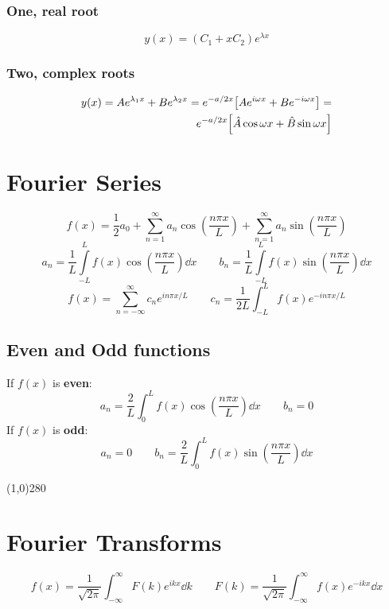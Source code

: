\documentclass[10pt,a4paper]{article}
\renewcommand{\b}{\textbf}
\renewcommand{\exp}{e^}
\newcommand{\infint}{\int_{-\infty}^{\infty}}
\newcommand{\oneinfsum}{\sum_{n=1}^{\infty}}
\newcommand{\holine}{\line(1,0){280}}
\newcommand{\half}{\frac{1}{2}}
\begin{document}
\begin{multicols}{2}
\subsubsection*{One, real root}
\[
    y(x) = (C_1 + xC_2)\exp{\lambda x}
\]


\subsubsection*{Two, complex roots}
\begin{equation*}
\begin{split}
    y(x) = A\exp{\lambda_1 x} + B\exp{\lambda_2 x} = \exp{-a/2 x}\qty[A\exp{i\omega x} + B\exp{-i\omega x}] =\\
    \exp{-a/2 x}\qty[\hat{A}\cos{\omega x} + \hat{B}\sin{\omega x}]
\end{split}
\end{equation*}






\newpage


\section*{Fourier Series}
\[
    f(x) = \half a_0 + \oneinfsum a_n\cos(\frac{n\pi x}{L}) + \oneinfsum a_n\sin(\frac{n\pi x}{L})
\]
\[
    a_n = \frac{1}{L}\int\limits_{-L}^{L}f(x) \cos(\frac{n\pi x}{L}) \dd{x} \quad\quad
    b_n = \frac{1}{L}\int\limits_{-L}^{L}f(x) \sin(\frac{n\pi x}{L}) \dd{x}
\]
\[
    f(x) = \sum_{n=-\infty}^{\infty} c_n \exp{in\pi x/L}  \quad\quad
    c_n = \frac{1}{2L}\int_{-L}^L f(x) \exp{-in\pi x/L}
\]

\subsection*{Even and Odd functions}
If $f(x)$ is \b{even}:
\[
    a_n = \frac{2}{L}\int_0^L f(x)\cos(\frac{n\pi x}{L}) \dd{x} \quad\quad b_n = 0
\]
If $f(x)$ is \b{odd}:
\[
    a_n = 0 \quad\quad b_n = \frac{2}{L}\int_0^L f(x)\sin(\frac{n\pi x}{L}) \dd{x}
\]

\holine

\section*{Fourier Transforms}
\[
    f(x) = \frac{1}{\sqrt{2\pi}} \infint F(k) \exp{ikx} \dd{k} \quad\quad
    F(k) = \frac{1}{\sqrt{2\pi}} \infint f(x) \exp{-ikx} \dd{x}
\]


\end{multicols}
\end{document}
